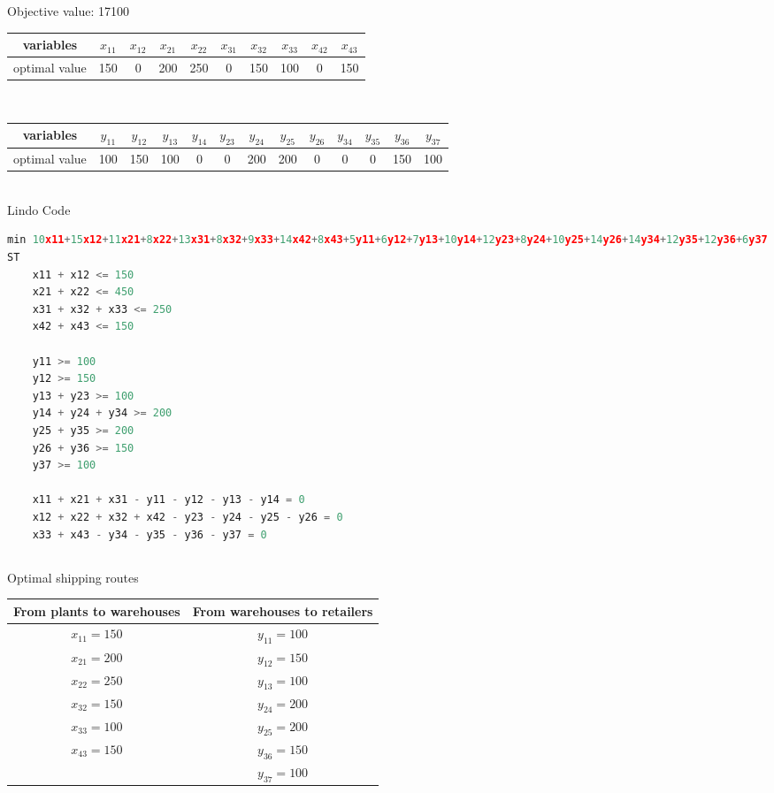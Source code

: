 \documentclass[11pt]{scrreprt}
\begin{document}
Objective value: 17100  \\

\begin{tabular}{|c|c|c|c|c|c|c|c|c|c|}
	\hline variables & $x_{11}$   &  $x_{12}$ & $x_{21}$ & $x_{22}$ & $x_{31}$ & $x_{32}$ & $x_{33}$ & $x_{42}$ & $x_{43}$      \\
	\hline optimal value & 150  &  0 & 200 & 250 & 0 & 150 & 100 & 0 & 150            \\
	\hline
\end{tabular} \\

\begin{tabular}{|c|c|c|c|c|c|c|c|c|c|c|c|c|}
	\hline variables & $y_{11}$ & $y_{12}$ & $y_{13}$ & $y_{14}$ & $y_{23}$ & $y_{24}$ & $y_{25}$ & $y_{26}$ & $y_{34}$ & $y_{35}$ & $y_{36}$ & $y_{37}$  \\
	\hline optimal value & 	100 & 150 & 100 & 0 & 0 & 200 & 200 & 0 & 0 & 0 & 150 & 100 \\
	 \hline
\end{tabular} \\

Lindo Code

\begin{lstlisting}[language=c]
min 10x11+15x12+11x21+8x22+13x31+8x32+9x33+14x42+8x43+5y11+6y12+7y13+10y14+12y23+8y24+10y25+14y26+14y34+12y35+12y36+6y37
ST
	x11 + x12 <= 150
	x21 + x22 <= 450
	x31 + x32 + x33 <= 250
	x42 + x43 <= 150

	y11 >= 100
	y12 >= 150
	y13 + y23 >= 100
	y14 + y24 + y34 >= 200
	y25 + y35 >= 200
	y26 + y36 >= 150
	y37 >= 100

	x11 + x21 + x31 - y11 - y12 - y13 - y14 = 0
	x12 + x22 + x32 + x42 - y23 - y24 - y25 - y26 = 0
	x33 + x43 - y34 - y35 - y36 - y37 = 0
\end{lstlisting}

\subsection{}
Optimal shipping routes \\

\begin{tabular}{|c|c|}
	\hline From plants to warehouses & From warehouses to retailers \\
	\hline $x_{11} = 150$ & $y_{11} = 100$ \\
	\hline $x_{21} = 200$ &$y_{12} = 150$ \\
	\hline $x_{22} = 250$ &$y_{13} = 100$ \\
	\hline $x_{32} = 150$ &$y_{24} = 200$ \\
	\hline $x_{33} = 100$ & $y_{25} = 200$  \\
	\hline $x_{43} = 150$ & $y_{36} = 150$  \\
	\hline & $y_{37} = 100$ \\
	\hline
\end{tabular} \\
\end{document}

